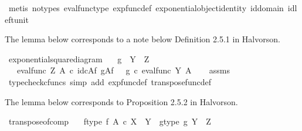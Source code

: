 \begin{isabellebody}
\ {\isacharparenleft}{\kern0pt}metis\ {\isacharparenleft}{\kern0pt}no{\isacharunderscore}{\kern0pt}types{\isacharparenright}{\kern0pt}\ eval{\isacharunderscore}{\kern0pt}func{\isacharunderscore}{\kern0pt}type\ exp{\isacharunderscore}{\kern0pt}func{\isacharunderscore}{\kern0pt}def\ exponential{\isacharunderscore}{\kern0pt}object{\isacharunderscore}{\kern0pt}identity\ id{\isacharunderscore}{\kern0pt}domain\ id{\isacharunderscore}{\kern0pt}left{\isacharunderscore}{\kern0pt}unit{}{\isacharparenright}{\kern0pt}%
\endisatagproof
{\isafoldproof}%
%
\isadelimproof
%
\endisadelimproof
%
\begin{isamarkuptext}%
The lemma below corresponds to a note below Definition 2.5.1 in Halvorson.%
\end{isamarkuptext}\isamarkuptrue%
\isamarkupfalse%
\ exponential{\isacharunderscore}{\kern0pt}square{\isacharunderscore}{\kern0pt}diagram{\isacharcolon}{\kern0pt}\isanewline
\ \ \ {\isachardoublequoteopen}g\ {\isacharcolon}{\kern0pt}\ Y\ {\isasymrightarrow}\ Z{\isachardoublequoteclose}\isanewline
\ \ \ {\isachardoublequoteopen}{\isacharparenleft}{\kern0pt}eval{\isacharunderscore}{\kern0pt}func\ Z\ A{\isacharparenright}{\kern0pt}\ {\isasymcirc}\isactrlsub c\ {\isacharparenleft}{\kern0pt}id\isactrlsub c{\isacharparenleft}{\kern0pt}A{\isacharparenright}{\kern0pt}{\isasymtimes}\isactrlsub f\ g\isactrlbsup A\isactrlesup \isactrlsub f{\isacharparenright}{\kern0pt}\ \ {\isacharequal}{\kern0pt}\ g\ {\isasymcirc}\isactrlsub c\ {\isacharparenleft}{\kern0pt}eval{\isacharunderscore}{\kern0pt}func\ Y\ A{\isacharparenright}{\kern0pt}{\isachardoublequoteclose}\isanewline
%
\isadelimproof
\ \ %
\endisadelimproof
%
\isatagproof
{}\isamarkupfalse%
\ assms\ \isamarkupfalse%
\ {\isacharparenleft}{\kern0pt}typecheck{\isacharunderscore}{\kern0pt}cfuncs{\isacharcomma}{\kern0pt}\ simp\ add{\isacharcolon}{\kern0pt}\ exp{\isacharunderscore}{\kern0pt}func{\isacharunderscore}{\kern0pt}def{}\ transpose{\isacharunderscore}{\kern0pt}func{\isacharunderscore}{\kern0pt}def{\isacharparenright}{\kern0pt}%
\endisatagproof
{\isafoldproof}%
%
\isadelimproof
%
\endisadelimproof
%
\begin{isamarkuptext}%
The lemma below corresponds to Proposition 2.5.2 in Halvorson.%
\end{isamarkuptext}\isamarkuptrue%
\isamarkupfalse%
\ transpose{\isacharunderscore}{\kern0pt}of{\isacharunderscore}{\kern0pt}comp{\isacharcolon}{\kern0pt}\isanewline
\ \ \ f{\isacharunderscore}{\kern0pt}type{\isacharcolon}{\kern0pt}\ {\isachardoublequoteopen}f{\isacharcolon}{\kern0pt}\ A\ {\isasymtimes}\isactrlsub c\ X\ {\isasymrightarrow}\ Y{\isachardoublequoteclose}\ \ g{\isacharunderscore}{\kern0pt}type{\isacharcolon}{\kern0pt}\ {\isachardoublequoteopen}g{\isacharcolon}{\kern0pt}\ Y\ {\isasymrightarrow}\ Z{\isachardoublequoteclose}\isanewline

\end{isabellebody}
